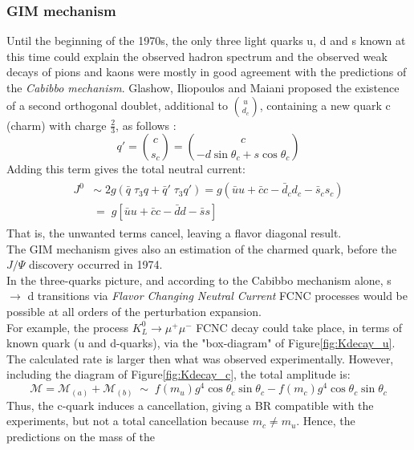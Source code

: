 \subsubsection{GIM mechanism}
Until the beginning of the 1970s, the only three light quarks u, d and s known at this time could explain the observed hadron spectrum and the observed weak decays of pions
and kaons were mostly in good agreement with the predictions of the \textit{Cabibbo mechanism}.
Glashow, Iliopoulos and Maiani proposed the existence of a second orthogonal doublet, additional to $\binom{u}{d_c}$,  containing a new quark c (charm) with charge $\frac{2}{3}$, as follows \cite{gim}:
\begin{equation} 
q' = \binom{c}{s_c} = \binom{c}{-d\sin\theta_{c}+s\cos\theta_c}
\end{equation}
Adding this term gives the total neutral current:
\begin {align}
\begin{split}
	J^{0} & \sim \; 2g (\bar{q} \; \tau_{3}q+ \bar{q}' \; \tau_{3}q')  = g(\bar{u} u + \bar{c}c - \bar{d}_{c} d_{c}- \bar{s}_{c} s_{c}) \\
	& = \; g[ \bar{u} u + \bar{c}c - \bar{d} d  - \bar{s}s ]
\end{split}						
\end{align}
That is, the unwanted terms cancel, leaving a flavor diagonal result.
\vspace{\baselineskip}
\\The GIM mechanism gives also an estimation of the charmed quark, before the $J/\Psi$ discovery occurred in 1974.\\
In the three-quarks picture, and according to the Cabibbo mechanism alone, s $\rightarrow$ d transitions via \textit{Flavor Changing Neutral Current} FCNC processes would be possible at all orders of the perturbation expansion. \\
For example, the process $K^{0}_{L}\rightarrow \mu^{+} \mu^{-}$ FCNC decay could take place, in terms of known quark (u and d-quarks), via the "box-diagram" of Figure\ref{fig:Kdecay_u}.\\
The calculated rate is larger then what was observed experimentally. However, including the diagram of Figure\ref{fig:Kdecay_c}, the total amplitude is:
\begin{equation} 
\mathcal{M} = \mathcal{M}_{(a)} +\mathcal{M}_{(b)} \;\sim\;f(m_u)g^{4}\cos\theta_{c}\sin\theta_{c} - f(m_c)g^{4}\cos\theta_{c}\sin\theta_{c}
\end{equation}
Thus, the c-quark induces a cancellation, giving a BR compatible with the experiments, but not a total cancellation because $m_{c}\neq m_{u}$. Hence, the predictions on the mass of the
